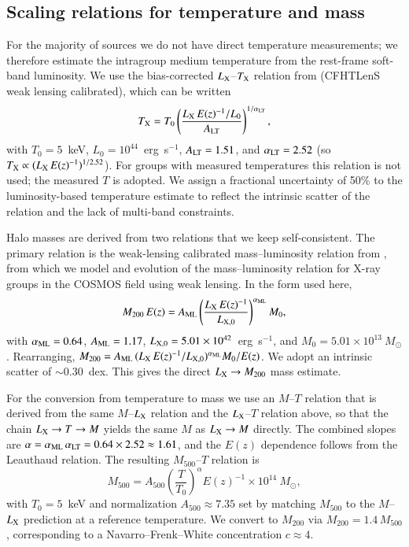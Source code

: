 \documentclass{aa}
\begin{document}
\subsection{Scaling relations for temperature and mass}
\label{sec:scaling}

For the majority of sources we do not have direct temperature measurements; we therefore estimate the intragroup medium temperature from the rest-frame soft-band luminosity. We use the bias-corrected $L_{\rm X}$--$T_{\rm X}$ relation from \citet{Kettula2015} (CFHTLenS weak lensing calibrated), which can be written
\begin{equation}
T_{\rm X} = T_0 \left( \frac{L_{\rm X}\, E(z)^{-1}/L_0}{A_{\rm LT}} \right)^{1/\alpha_{\rm LT}},
\label{eq:TL}
\end{equation}
with $T_0 = 5$~keV, $L_0 = 10^{44}$~erg~s$^{-1}$, $A_{\rm LT} = 1.51$, and $\alpha_{\rm LT} = 2.52$ (so $T_{\rm X} \propto (L_{\rm X}\, E(z)^{-1})^{1/2.52}$). For groups with measured temperatures this relation is not used; the measured $T$ is adopted. We assign a fractional uncertainty of 50\% to the luminosity-based temperature estimate to reflect the intrinsic scatter of the relation and the lack of multi-band constraints.

Halo masses are derived from two relations that we keep self-consistent. The primary relation is the weak-lensing calibrated mass--luminosity relation from \citet{Leauthaud2010}, from which we model and evolution of the mass--luminosity relation for X-ray groups in the COSMOS field using weak lensing. In the form used here,
\begin{equation}
M_{200}\, E(z) = A_{\rm ML} \left(\frac{L_{\rm X}\, E(z)^{-1}}{L_{{\rm X},0}}\right)^{\alpha_{\rm ML}} M_0,
\label{eq:ML}
\end{equation}
with $\alpha_{\rm ML} = 0.64$, $A_{\rm ML} = 1.17$, $L_{{\rm X},0} = 5.01 \times 10^{42}$~erg~s$^{-1}$, and $M_0 = 5.01 \times 10^{13}~M_{\odot}$. Rearranging, $M_{200} = A_{\rm ML}\,(L_{\rm X}\,E(z)^{-1}/L_{{\rm X},0})^{\alpha_{\rm ML}} M_0/E(z)$. We adopt an intrinsic scatter of $\sim 0.30$~dex. This gives the direct $L_{\rm X} \to M_{200}$ mass estimate.

For the conversion from temperature to mass we use an $M$--$T$ relation that is derived from the same \citet{Leauthaud2010} $M$--$L_{\rm X}$ relation and the \citet{Kettula2015} $L_{\rm X}$--$T$ relation above, so that the chain $L_{\rm X} \to T \to M$ yields the same $M$ as $L_{\rm X} \to M$ directly. The combined slopes are $\alpha = \alpha_{\rm ML}\,\alpha_{\rm LT} = 0.64 \times 2.52 \approx 1.61$, and the $E(z)$ dependence follows from the Leauthaud relation. The resulting $M_{500}$--$T$ relation is
\begin{equation}
M_{500} = A_{500} \left(\frac{T}{T_0}\right)^{\alpha} E(z)^{-1} \times 10^{14}~M_{\odot},
\label{eq:MT}
\end{equation}
with $T_0 = 5$~keV and normalization $A_{500} \approx 7.35$ set by matching $M_{500}$ to the $M$--$L_{\rm X}$ prediction at a reference temperature. We convert to $M_{200}$ via $M_{200} = 1.4\,M_{500}$, corresponding to a Navarro--Frenk--White \citep{Navarro1997} concentration $c \approx 4$.
\end{document}
